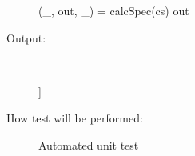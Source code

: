 \documentclass[12pt, titlepage]{article}
\begin{document}
\begin{addmargin}[2em]{0em}
\begin{addmargin}[2em]{0em}
\begin{description}
\begin{python}
(_, out, _) = calcSpec(cs)
out
\end{python}
					
\item[Output:] ~\newline

\begin{python}
[[10**(-x/100) for x in range(0, 1401)]]	
\end{python}
				
\item[How test will be performed:] Automated unit test\\
\end{description}
\end{addmargin}

\end{addmargin}

\end{document}
